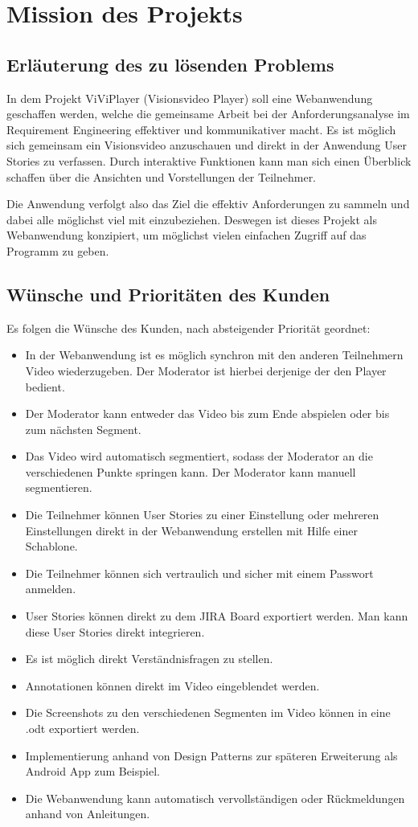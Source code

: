 \section{Mission des Projekts}

\subsection{Erläuterung des zu lösenden Problems}
In dem Projekt ViViPlayer (Visionsvideo Player) soll eine Webanwendung geschaffen werden, welche die gemeinsame Arbeit 
bei der Anforderungsanalyse im Requirement Engineering effektiver und kommunikativer macht.
Es ist möglich sich gemeinsam ein Visionsvideo anzuschauen und direkt in der Anwendung User Stories
zu verfassen. Durch interaktive Funktionen kann man sich einen Überblick schaffen über die Ansichten und Vorstellungen der Teilnehmer.

Die Anwendung verfolgt also das Ziel die effektiv Anforderungen zu sammeln und dabei alle möglichst viel mit einzubeziehen.
Deswegen ist dieses Projekt als Webanwendung konzipiert, um möglichst vielen einfachen Zugriff auf das Programm zu geben.

\subsection{Wünsche und Prioritäten des Kunden}
	Es folgen die Wünsche des Kunden, nach absteigender Priorität geordnet:
	\begin{itemize}
		\item In der Webanwendung ist es möglich synchron mit den anderen Teilnehmern Video wiederzugeben. Der Moderator ist hierbei derjenige der den Player bedient.
		\item Der Moderator kann entweder das Video bis zum Ende abspielen oder bis zum nächsten Segment.
		\item Das Video wird automatisch segmentiert, sodass der Moderator an die verschiedenen Punkte springen kann. Der Moderator kann manuell segmentieren.
		\item Die Teilnehmer können User Stories zu einer Einstellung oder mehreren Einstellungen direkt in der Webanwendung erstellen mit Hilfe einer Schablone.
		\item Die Teilnehmer können sich vertraulich und sicher mit einem Passwort anmelden.
		\item User Stories können direkt zu dem JIRA Board exportiert werden. Man kann diese User Stories direkt integrieren.
		\item Es ist möglich direkt Verständnisfragen zu stellen.
		\item Annotationen können direkt im Video eingeblendet werden.
		\item Die Screenshots zu den verschiedenen Segmenten im Video können in eine .odt exportiert werden.
		\item Implementierung anhand von Design Patterns zur späteren Erweiterung als Android App zum Beispiel.
		\item Die Webanwendung kann automatisch vervollständigen oder Rückmeldungen anhand von Anleitungen.
	\end{itemize}

